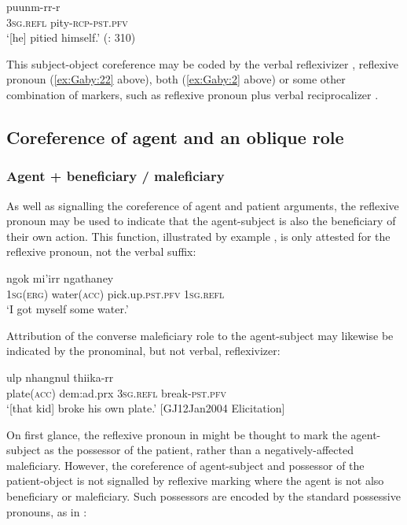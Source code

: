 \documentclass[output=paper]{langscibook}
\begin{document}
\ea 
    \label{ex:Gaby:17}
      {puunm-rr-r}\\
    \textsc{3sg}.\textsc{refl}  pity\textsc{{}-rcp-pst.pfv} \\
    \glt  ‘[he] pitied himself.’ (\citealt{FooteHall1992}: 310)
    \z

This subject-object coreference may be coded by the verbal reflexivizer , reflexive pronoun (\ref{ex:Gaby:22} above), both (\ref{ex:Gaby:2} above) or some other combination of markers, such as reflexive pronoun plus verbal reciprocalizer . 

\subsection{Coreference of agent and an oblique role}\label{sec:Gaby:4.2}
\subsubsection{Agent + beneficiary / maleficiary}\label{sec:Gaby:4.2.2}
As well as signalling the coreference of agent and patient arguments, the reflexive pronoun may be used to indicate that the agent-subject is also the beneficiary of their own action. This function, illustrated by example , is only attested for the reflexive pronoun, not the verbal suffix:

\ea 
    \label{ex:Gaby:18}
      {ngok}  {mi’irr}  {ngathaney}\\
    \textsc{1sg}(\textsc{erg})  water(\textsc{acc})  pick.up.\textsc{pst.pfv}  \textsc{1sg}.\textsc{refl}\\
    \glt ‘I got myself some water.’ \citep[379]{Hall1972}
    \z
 
Attribution of the converse maleficiary role to the agent-subject may likewise be indicated by the pronominal, but not verbal, reflexivizer:

\ea 
    \label{ex:Gaby:19}
      {ulp}  {nhangnul}  {thiika-rr}\\
    plate\textsc{(acc})  dem:ad.prx  \textsc{3sg}.\textsc{refl}  break-\textsc{pst.pfv}\\
    \glt ‘[that kid] broke his own plate.’
    [GJ12Jan2004 Elicitation]
    \z

 
  



On first glance, the reflexive pronoun in  might be thought to mark the agent-subject as the possessor of the patient, rather than a negatively-affected maleficiary. However, the coreference of agent-subject and possessor of the patient-object is not signalled by reflexive marking where the agent is not also beneficiary or maleficiary. Such possessors are encoded by the standard possessive pronouns, as in : 
\end{document}
